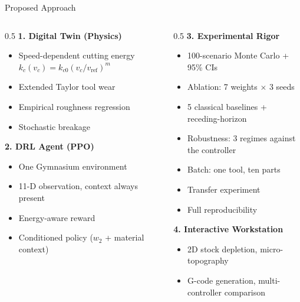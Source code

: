 ﻿\documentclass[11pt,aspectratio=169]{beamer}
\begin{document}
\begin{frame}{Proposed Approach}
    \small
    \begin{columns}[T]
        \begin{column}{0.5\textwidth}
            \textbf{1. Digital Twin (Physics)}
            \begin{itemize}
                \item Speed-dependent cutting energy $k_c(v_c) = k_{c0}(v_c/v_{\text{ref}})^m$
                \item Extended Taylor tool wear
                \item Empirical roughness regression
                \item Stochastic breakage
            \end{itemize}

            \textbf{2. DRL Agent (PPO)}
            \begin{itemize}
                \item One Gymnasium environment
                \item 11-D observation, context always present
                \item Energy-aware reward
                \item Conditioned policy ($w_2$ + material context)
            \end{itemize}
        \end{column}
        \begin{column}{0.5\textwidth}
            \textbf{3. Experimental Rigor}
            \begin{itemize}
                \item 100-scenario Monte Carlo + 95\% CIs
                \item Ablation: 7 weights $\times$ 3 seeds
                \item 5 classical baselines + receding-horizon
                \item Robustness: 3 regimes against the controller
                \item Batch: one tool, ten parts
                \item Transfer experiment
                \item Full reproducibility
            \end{itemize}

            \textbf{4. Interactive Workstation}
            \begin{itemize}
                \item 2D stock depletion, micro-topography
                \item G-code generation, multi-controller comparison
            \end{itemize}
        \end{column}
    \end{columns}
\end{frame}
\end{document}
